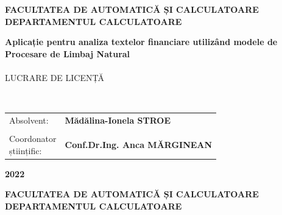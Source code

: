 \pagestyle{fancy}
\setlength{\voffset}{-10pt}
\setlength\headheight{100.0pt}
\renewcommand{\headrulewidth}{0pt}
\cfoot{}
\lfoot{}
\rfoot{}
\renewcommand{\thesisauthor}{Mădălina-Ionela STROE}    %
\renewcommand{\thesismonth}{Septembrie}     %
\renewcommand{\thesisyear}{2022}      %
\renewcommand{\thesistitle}{Aplicație pentru analiza textelor financiare utilizând modele de Procesare de Limbaj Natural} %
\renewcommand{\thesissupervisor}{Conf.Dr.Ing. Anca MĂRGINEAN} %
\newcommand{\makeThesisTitle}{\textbf{\thesistitletypesize \thesistitle}}
\newcommand{\makeThesisType}{\thesistypetypesize \thesistype}
\newcommand{\department}{\sffamily\bfseries\small FACULTATEA DE AUTOMATICĂ ȘI CALCULATOARE\\
	DEPARTAMENTUL CALCULATOARE} 
\renewcommand{\thesistype}{LUCRARE DE LICENȚĂ}
\newcommand{\uline}[1]{\rule[0pt]{#1}{0.4pt}}
\begin{center}
	{\department}
	
	\vspace{4cm}
	\makeThesisTitle
	~\\~\\
	
	\makeThesisType
	
	~\\\vspace{6.5cm}
	
	\begin{tabular}{p{.3\linewidth}p{.5\linewidth}}
		{\hfill Absolvent:} & {\bf \thesisauthor} \\
		&\\
		{\parbox[t]{\linewidth}{\qquad\qquad\qquad Coordonator\\\hspace*{3.2cm}științific:}}& {\bf \thesissupervisor}\\
	\end{tabular}
	
	\vspace{3cm}
	{\bf \thesisyear}
\end{center}
\newpage
\begin{center}
	{\department}
\end{center}
\vspace{0.5cm}

